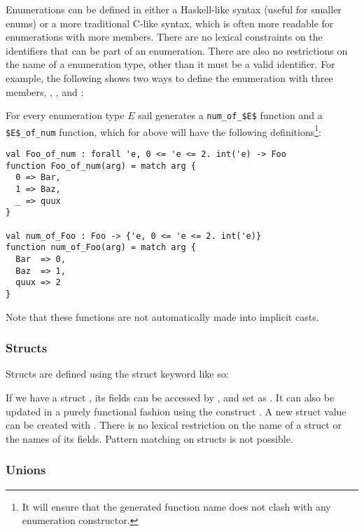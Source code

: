 Enumerations can be defined in either a Haskell-like syntax (useful
for smaller enums) or a more traditional C-like syntax, which is often
more readable for enumerations with more members. There are no lexical
constraints on the identifiers that can be part of an
enumeration. There are also no restrictions on the name of a
enumeration type, other than it must be a valid identifier. For
example, the following shows two ways to define the enumeration
 with three members, , , and :




For every enumeration type $E$ sail generates a
\lstinline[mathescape]{num_of_$E$} function and a
\lstinline[mathescape]{$E$_of_num} function, which for  above
will have the following definitions\footnote{It will ensure that the
  generated function name  does not clash with any enumeration
  constructor.}:
\begin{lstlisting}
val Foo_of_num : forall 'e, 0 <= 'e <= 2. int('e) -> Foo
function Foo_of_num(arg) = match arg {
  0 => Bar,
  1 => Baz,
  _ => quux
}

val num_of_Foo : Foo -> {'e, 0 <= 'e <= 2. int('e)}
function num_of_Foo(arg) = match arg {
  Bar  => 0,
  Baz  => 1,
  quux => 2
}
\end{lstlisting}
Note that these functions are not automatically made into implicit
casts.

\subsubsection{Structs}

Structs are defined using the struct keyword like so:


If we have a struct , its fields can be accessed by
, and set as . It can also be updated in
a purely functional fashion using the construct . A new struct value can be created with
. There is no lexical
restriction on the name of a struct or the names of its fields.
Pattern matching on structs is not possible.

\subsubsection{Unions}
\label{sec:union}

